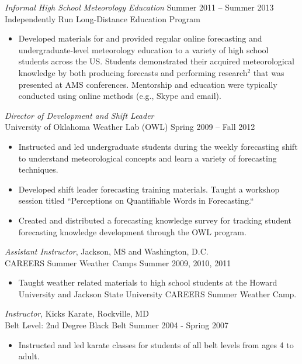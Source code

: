 \documentclass[10pt]{res} %
\begin{document}
\begin{resume}
{\sl  Informal High School Meteorology Education}  \hfill Summer 2011 -- Summer 2013 \\
Independently Run Long-Distance Education Program
\begin{itemize} \itemsep 2pt %
\item Developed materials for and provided regular online forecasting and undergraduate-level meteorology education to a variety of high school students across the US.  Students demonstrated their acquired meteorological knowledge by both producing forecasts and performing research$^{2}$ that was presented at AMS conferences.  Mentorship and education were typically conducted using online methods (e.g., Skype and email).
\end{itemize} 

{\sl Director of Development and Shift Leader} \\[2pt]
University of Oklahoma Weather Lab (OWL) \hfill Spring 2009 -- Fall 2012 
\begin{itemize} \itemsep 2pt %
\item Instructed and led undergraduate students during the weekly forecasting shift to understand meteorological concepts and learn a variety of forecasting techniques.
\item Developed shift leader forecasting training materials.  Taught a workshop session titled ``Perceptions on Quantifiable Words in Forecasting.``
\item Created and distributed a forecasting knowledge survey for tracking student forecasting knowledge development through the OWL program.
\end{itemize} 

{\sl Assistant Instructor}, Jackson, MS and Washington, D.C. \\[2pt]
CAREERS Summer Weather Camps \hfill Summer 2009, 2010, 2011 
\begin{itemize} \itemsep 2pt %
\item Taught weather related materials to high school students at the Howard University and Jackson State University CAREERS Summer Weather Camp.
\end{itemize} 

{\sl Instructor}, Kicks Karate, Rockville, MD \\[2pt]
Belt Level: 2nd Degree Black Belt \hfill Summer 2004 - Spring 2007 
\begin{itemize} \itemsep 2pt %
\item Instructed and led karate classes for students of all belt levels from ages 4 to adult.
\end{itemize} 



\end{resume}
\end{document}
